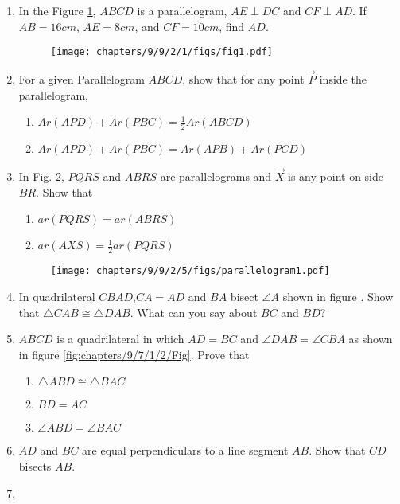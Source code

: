 \begin{enumerate}[label=\thesection.\arabic*,ref=\thesection.\theenumi]
\item In the Figure \ref{fig:9/9/2/1}, $ABCD$ is a parallelogram, $AE \perp DC$ and $CF \perp AD$. If $AB = 16 cm$, $AE = 8 cm$, and $CF = 10cm$, find $AD$.
	\begin{figure}[!h]
		\centering
 \texttt{[image: chapters/9/9/2/1/figs/fig1.pdf]}
		\caption{}
		\label{fig:9/9/2/1}
  	\end{figure}

\item For a given Parallelogram $ABCD$, show that for any
point $\vec{P}$ inside the parallelogram,
\begin{enumerate}
	\item $Ar(APD)+Ar(PBC) = \frac{1}{2}Ar(ABCD)$
	\item $Ar(APD)+Ar(PBC) = Ar(APB)+Ar(PCD)$
\end{enumerate}

\item In Fig.
		\ref{fig:9/9/2/5},
$PQRS$ and $ABRS$ are parallelograms
and $\vec{X}$ is any point on side $BR$. Show that  
\begin{enumerate}
    \item $ar (PQRS) = ar(ABRS)$
	    \label{prop:9/9/2/5}
    \item $ar(AXS) = \frac{1}{2} ar(PQRS)$
\end{enumerate}
	\begin{figure}[!h]
		\centering
 \texttt{[image: chapters/9/9/2/5/figs/parallelogram1.pdf]}
		\caption{}
		\label{fig:9/9/2/5}
  	\end{figure}

%	
\item In quadrilateral $CBAD$,$CA = AD$ and $BA$ bisect $\angle{A}$ shown in figure . Show that $\triangle{CAB} \cong \triangle{DAB}$. What can you say about $BC$ and $BD$? \\
	\solution

\item $ABCD$ is a quadrilateral in which $AD = BC$ and $\angle{DAB} = \angle{CBA}$ as shown in figure \ref{fig:chapters/9/7/1/2/Fig}. Prove that
\begin{enumerate}
\item $\triangle{ABD} \cong \triangle{BAC}$
  \item $BD = AC$
  \item $\angle{ABD} = \angle{BAC}$
\end{enumerate}
	\solution

\item $AD$ and $BC$ are equal perpendiculars to a line segment $AB$. Show that $CD$ bisects $AB$.\\
	\solution

\item


\end{enumerate}
